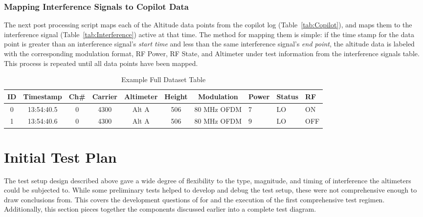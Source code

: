 \subsubsection{Mapping Interference Signals to Copilot Data}
The next post processing script maps each of the Altitude data points from the copilot log (Table~\ref{tab:Copilot}), and maps them to the interference signal (Table~\ref{tab:Interference}) active at that time. The method for mapping them is simple: if the time stamp for the data point is greater than an interference signal's \textit{start time} and less than the same interference signal's \textit{end point}, the altitude data is labeled with the corresponding modulation format, RF Power, RF State, and Altimeter under test information from the interference signals table. This process is repeated until all data points have been mapped. 

\begin{table}[]
\centering
\begin{tabular}{@{}ccccccclll@{}}

\toprule
ID & Timestamp  & Ch\# & Carrier& Altimeter & Height & Modulation  & Power& Status & RF \\ \midrule
0  & 13:54:40.5 & 0    & 4300              & Alt A     & 506             & 80 MHz OFDM & 7               & LO     & ON       \\
1  & 13:54:40.6 & 0    & 4300              & Alt A     & 506             & 80 MHz OFDM & 9               & LO     & OFF      \\ \bottomrule
\end{tabular}
\caption{Example Full Dataset Table}
\label{tab:Full}
\end{table}

\section{Initial Test Plan}
The test setup design described above gave a wide degree of flexibility to the type, magnitude, and timing of interference the altimeters could be subjected to. While some preliminary tests helped to develop and debug the test setup, these were not comprehensive enough to draw conclusions from. This covers the development questions of for and the execution of the first  comprehensive test regimen. Additionally, this section pieces together the components discussed earlier into a complete test diagram. 

